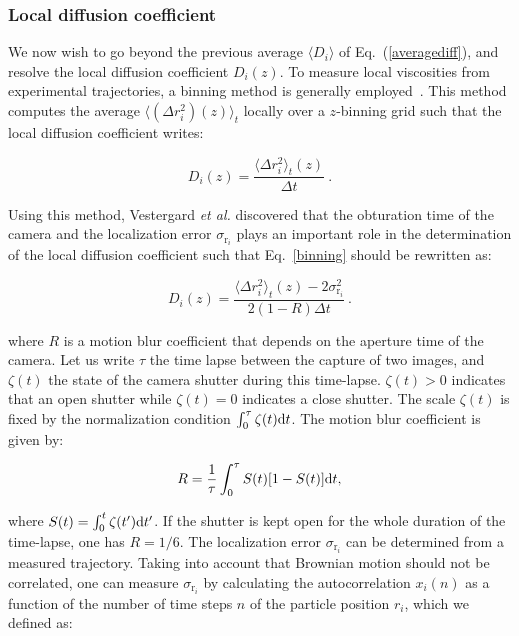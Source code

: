 \subsubsection{Local diffusion coefficient}

We now wish to go beyond the previous average $\langle D_i\rangle$ of Eq.~(\ref{averagediff}), and resolve the local diffusion coefficient $D_i(z)$. To measure local viscosities from experimental trajectories, a binning method is generally employed~\cite{friedrich_approaching_2011}. This method computes the average $\langle ( \Delta r_i^2 ) (z) \rangle_t$ locally over a $z$-binning grid such that the local diffusion coefficient writes:

\begin{equation}
	D_i(z) = \frac{\langle  \Delta r_i^2  \rangle _t (z)}{\Delta t} ~.
	\label{binning}
\end{equation}

Using this method, Vestergard \textit{et al.} \cite{vestergaard_estimation_2015} discovered that the obturation time of the camera and the localization error $\sigma_{\mathrm{r}_i}$ plays an important role in the determination of the local diffusion coefficient such that Eq.~\ref{binning} should be rewritten as:

\begin{equation}
	D_i(z) = \frac{\langle  \Delta r_i^2 \rangle _t (z) - 2 \sigma_{\mathrm{r}_i}^2}{2(1 - R)\Delta t}~.
	\label{binning_vestergaard}
\end{equation}

where $R$ is a motion blur coefficient that depends on the aperture time of the camera. Let us write $\tau$ the time lapse between the capture of two images, and $\zeta(t)$ the state of the camera shutter during this time-lapse. $\zeta(t) > 0$ indicates that an open shutter while  $\zeta(t) = 0$ indicates a close shutter. The scale $\zeta(t)$ is fixed by the normalization condition $\int_{0}^{\tau} \zeta(t)\textnormal{d}t$. The motion blur coefficient is given by:

\begin{equation}
	R = \frac{1}{\tau} \int_{0}^{\tau} S(t)[1 - S(t)] \textnormal{d}t,
\end{equation}

where $S(t) = \int_{0}^{t}\zeta(t') \textnormal{d}t'$. If the shutter is kept open for the whole duration of the time-lapse, one has $R = 1/6$. The localization error $\sigma_{\mathrm{r}_i}$ can be determined from a measured trajectory. Taking into account that Brownian motion should not be correlated, one can measure $\sigma_{\mathrm{r}_i}$ by calculating the autocorrelation $x_i(n)$ as a function of the number of time steps $n$ of the particle position $r_i$, which we defined as:

